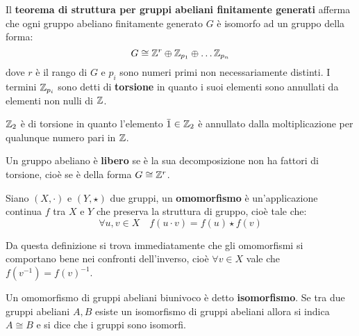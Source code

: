 \begin{theorem}
  Il \textbf{teorema di struttura per gruppi abeliani finitamente
    generati} afferma che ogni gruppo abeliano finitamente generato $ G $ è isomorfo
  ad un gruppo della forma:
  \[
    G \cong \mathbb{Z}^r \oplus \mathbb{Z}_{p_1} \oplus \dots \mathbb{Z}_{p_n}
  \]
  dove $ r $ è il rango di $ G $ e $ p_i $ sono numeri primi non necessariamente
  distinti. I termini $ \mathbb{Z}_{p_i} $ sono detti di \textbf{torsione} in quanto i suoi
  elementi sono annullati da elementi non nulli di $ \mathbb{Z} $.
\end{theorem}
\begin{example}
  $ \mathbb{Z}_2 $ è di torsione in quanto l'elemento $ \bar{1} \in \mathbb{Z}_2 $ è annullato
  dalla moltiplicazione per qualunque numero pari in $ \mathbb{Z} $.
\end{example}

\begin{osservation}
  Un gruppo abeliano è \textbf{libero} se è la sua
  decomposizione non ha fattori di torsione, cioè se è della forma $ G \cong \mathbb{Z}^r $.
\end{osservation}

\begin{definition}
  Siano $ (X, \cdot) $ e $ (Y, \star) $ due gruppi, un \textbf{omomorfismo}
   è un'applicazione continua $ f $ tra $ X $ e $ Y $ che
  preserva la struttura di gruppo, cioè tale che:
  \[
    \forall u,v \in X \quad f(u \cdot v) = f(u) \star f(v)
  \]
\end{definition}

\begin{osservation}
  Da questa definizione si trova immediatamente che gli omomorfismi si comportano bene nei
  confronti dell'inverso, cioè $ \forall v \in X $ vale che $ f(v^{-1}) = {f(v)}^{-1} $.
\end{osservation}

\begin{definition}
  Un omomorfismo di gruppi abeliani biunivoco è detto
  \textbf{isomorfismo}. Se tra due gruppi abeliani $ A, B $
  esiste un isomorfismo di gruppi abeliani allora si indica $ A \cong B $ e si
  dice che i gruppi sono isomorfi.
\end{definition}

